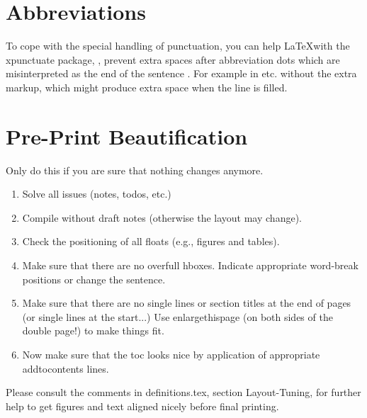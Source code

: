 \section{Abbreviations}
\label{sec:abbreviations}

To cope with the special handling of punctuation, you can help \LaTeX with the xpunctuate package, \ie, prevent extra spaces after abbreviation dots which are misinterpreted as the end of the sentence \etc. For example in etc. without the extra markup, which might produce extra space when the line is filled.


\section{Pre-Print Beautification}
\label{sec:pre-print-beaut}

Only do this if you are sure that nothing changes anymore.

\begin{enumerate}
\item Solve all issues (notes, todos, etc.)
\item Compile without draft notes (otherwise the layout may change).
\item Check the positioning of all floats (e.g., figures and tables).
\item Make sure that there are no overfull hboxes. Indicate appropriate word-break positions or change the sentence.
\item Make sure that there are no single lines or section titles at the end of pages (or single lines at the start...) Use enlargethispage (on both sides of the double page!) to make things fit.
\item Now make sure that the toc looks nice by application of appropriate addtocontents lines.
\end{enumerate}

Please consult the comments in definitions.tex, section Layout-Tuning, for further help to get figures and text aligned nicely before final printing.

\enlargethispage{4\baselineskip}


